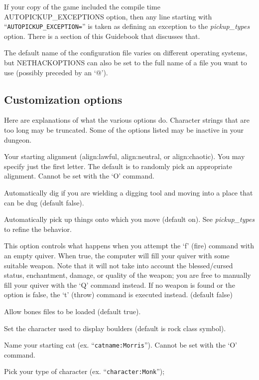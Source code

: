If your copy of the game included the compile time AUTOPICKUP\_EXCEPTIONS
option, then any line starting with ``{\tt AUTOPICKUP\_EXCEPTION=}'' is taken
as defining an exception to the 
{\it pickup\_types }
option. 
There is a section of this Guidebook that discusses that.

The default name of the configuration file varies on different
operating systems, but NETHACKOPTIONS can also be set to
the full name of a file you want to use (possibly preceded by an `@').
\subsection*{Customization options}

Here are explanations of what the various options do.
Character strings that are too long may be truncated.
Some of the options listed may be inactive in your dungeon.
\blist{}
\item[\tb{align}]
Your starting alignment (align:lawful, align:neutral,
or align:chaotic).  You may specify just the first letter.
The default is to randomly pick an appropriate alignment.
Cannot be set with the `O' command.
\item[\tb{autodig}]
Automatically dig if you are wielding a digging tool and moving into a place
that can be dug (default false).
\item[\tb{``autopickup  ''}]
Automatically pick up things onto which you move (default on). 
See
{\it pickup\_types }
to refine the behavior.
\item[\tb{``autoquiver  ''}]
This option controls what happens when you attempt the `f' (fire)
command with an empty quiver.  When true, the computer will fill
your quiver with some suitable weapon.  Note that it will not take
into account the blessed/cursed status, enchantment, damage, or
quality of the weapon; you are free to manually fill your quiver with
the `Q' command instead.  If no weapon is found or the option is
false, the `t' (throw) command is executed instead.  (default false)
\item[\tb{bones   }]
Allow bones files to be loaded (default true).
\item[\tb{boulder}]
Set the character used to display boulders (default is rock class symbol).
\item[\tb{catname}]
Name your starting cat (ex. ``{\tt catname:Morris}'').
Cannot be set with the `O' command.
\item[\tb{character}]
Pick your type of character (ex. ``{\tt character:Monk}'');

